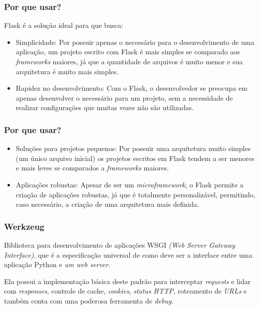 \documentclass[t]{beamer}
\begin{document}
\begin{frame}
	\frametitle{Por que usar?}
	Flask é a solução ideal para que busca:
	\vspace{.5cm}
	
	\begin{itemize}
		\item Simplicidade: Por possuir apenas o necessário para o desenvolvimento de uma aplicação, um projeto escrito com Flask é mais simples se comparado aos \textit{frameworks} maiores, já que a quantidade de arquivos é muito menor e sua arquitetura é muito mais simples. 
		\vspace{.5cm}
		
		\item Rapidez no desenvolvimento: Com o Flask, o desenvolvedor se preocupa em apenas desenvolver o necessário para um projeto, sem a necessidade de realizar configurações que muitas vezes não são utilizadas.
	\end{itemize}
\end{frame}

\begin{frame}
	\frametitle{Por que usar?}
	\begin{itemize}
		\item Soluções para projetos pequenos: Por possuir uma arquitetura muito simples (um único arquivo inicial) os projetos escritos em Flask tendem a ser menores e mais leves se comparados a \textit{frameworks} maiores. 
		
		\vspace{.5cm}
		\item Aplicações robustas: Apesar de ser um \textit{microframework}, o Flask permite a criação de aplicações robustas, já que é totalmente personalizável, permitindo, caso necessário, a criação de uma arquitetura mais definida. 
	\end{itemize}		  
\end{frame}

\begin{frame}
	\frametitle{Werkzeug}
	 Biblioteca para desenvolvimento de aplicações WSGI \textit{(Web Server Gateway Interface)}, que é a especificação universal de como deve ser a interface entre uma aplicação Python e \textit{um web server}. 
	 \vspace{.5cm}
	 
	 Ela possui a implementação básica deste padrão para interceptar \textit{requests} e lidar com \textit{responses}, controle de cache, \textit{cookies}, \textit{status HTTP}, roteamento de \textit{URLs} e também conta com uma poderosa ferramenta de \textit{debug}.
\end{frame}
\end{document}
